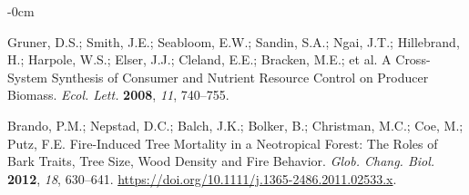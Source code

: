 \documentclass[entropy,article,accept,pdftex,moreauthors]{Definitions/mdpi}
\begin{document}
\begin{adjustwidth}{-\extralength}{0cm}



%

\begin{thebibliography}{999}

  \label{refs}

Gruner, D.S.; Smith, J.E.; Seabloom, E.W.;  Sandin, S.A.; Ngai, J.T.; Hillebrand,  H.; Harpole, W.S.; Elser, J.J.; Cleland, E.E.; Bracken, M.E.; et al. A Cross-System Synthesis of Consumer and Nutrient Resource Control on Producer Biomass. 
\emph{Ecol. Lett.} \textbf{2008}, \emph{11},  740--755.

Brando, P.M.; Nepstad, D.C.; Balch, J.K.; Bolker, B.; Christman, M.C.; Coe, M.; Putz, F.E. Fire-Induced Tree Mortality in a
Neotropical Forest: The Roles of Bark Traits, Tree Size, Wood Density
and Fire Behavior.  \emph{Glob. Chang. Biol.} \textbf{2012}, \emph{18}, 630--641.
\url{https://doi.org/10.1111/j.1365-2486.2011.02533.x}.


\end{thebibliography}
\end{adjustwidth}
\end{document}
